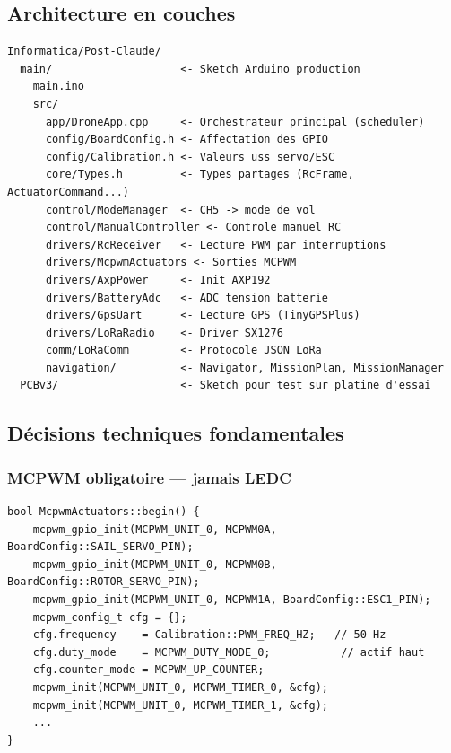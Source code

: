 \documentclass[12pt,a4paper]{article}
\begin{document}
\subsection{Architecture en couches}

\begin{lstlisting}[style=shell, caption={Arborescence du projet Post-Claude}]
Informatica/Post-Claude/
  main/                    <- Sketch Arduino production
    main.ino
    src/
      app/DroneApp.cpp     <- Orchestrateur principal (scheduler)
      config/BoardConfig.h <- Affectation des GPIO
      config/Calibration.h <- Valeurs uss servo/ESC
      core/Types.h         <- Types partages (RcFrame, ActuatorCommand...)
      control/ModeManager  <- CH5 -> mode de vol
      control/ManualController <- Controle manuel RC
      drivers/RcReceiver   <- Lecture PWM par interruptions
      drivers/McpwmActuators <- Sorties MCPWM
      drivers/AxpPower     <- Init AXP192
      drivers/BatteryAdc   <- ADC tension batterie
      drivers/GpsUart      <- Lecture GPS (TinyGPSPlus)
      drivers/LoRaRadio    <- Driver SX1276
      comm/LoRaComm        <- Protocole JSON LoRa
      navigation/          <- Navigator, MissionPlan, MissionManager
  PCBv3/                   <- Sketch pour test sur platine d'essai
\end{lstlisting}

\subsection{Décisions techniques fondamentales}

\subsubsection{MCPWM obligatoire — jamais LEDC}

\begin{lstlisting}[style=cpp, caption={McpwmActuators.cpp -- initialisation MCPWM}]
bool McpwmActuators::begin() {
    mcpwm_gpio_init(MCPWM_UNIT_0, MCPWM0A, BoardConfig::SAIL_SERVO_PIN);
    mcpwm_gpio_init(MCPWM_UNIT_0, MCPWM0B, BoardConfig::ROTOR_SERVO_PIN);
    mcpwm_gpio_init(MCPWM_UNIT_0, MCPWM1A, BoardConfig::ESC1_PIN);
    mcpwm_config_t cfg = {};
    cfg.frequency    = Calibration::PWM_FREQ_HZ;   // 50 Hz
    cfg.duty_mode    = MCPWM_DUTY_MODE_0;           // actif haut
    cfg.counter_mode = MCPWM_UP_COUNTER;
    mcpwm_init(MCPWM_UNIT_0, MCPWM_TIMER_0, &cfg);
    mcpwm_init(MCPWM_UNIT_0, MCPWM_TIMER_1, &cfg);
    ...
}
\end{lstlisting}
\end{document}

